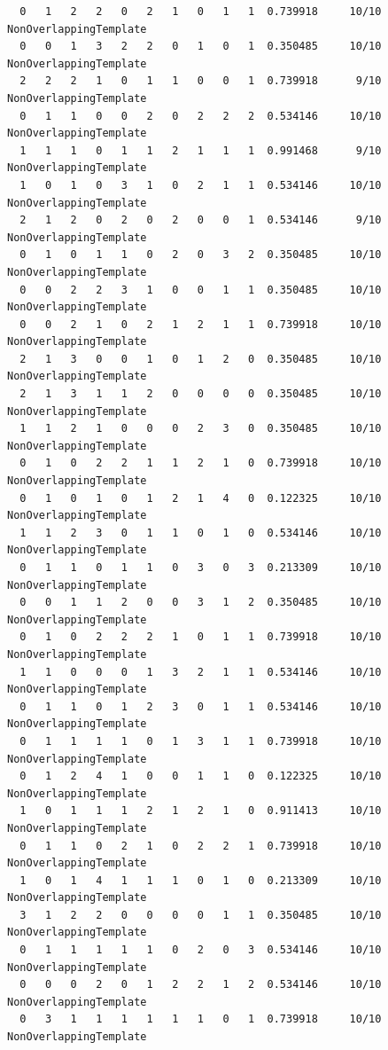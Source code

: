 \documentclass[12pt, titlepage]{report}
\theoremstyle{definition}
\begin{document}
\begin{verbatim}
  0   1   2   2   0   2   1   0   1   1  0.739918     10/10      NonOverlappingTemplate
  0   0   1   3   2   2   0   1   0   1  0.350485     10/10      NonOverlappingTemplate
  2   2   2   1   0   1   1   0   0   1  0.739918      9/10      NonOverlappingTemplate
  0   1   1   0   0   2   0   2   2   2  0.534146     10/10      NonOverlappingTemplate
  1   1   1   0   1   1   2   1   1   1  0.991468      9/10      NonOverlappingTemplate
  1   0   1   0   3   1   0   2   1   1  0.534146     10/10      NonOverlappingTemplate
  2   1   2   0   2   0   2   0   0   1  0.534146      9/10      NonOverlappingTemplate
  0   1   0   1   1   0   2   0   3   2  0.350485     10/10      NonOverlappingTemplate
  0   0   2   2   3   1   0   0   1   1  0.350485     10/10      NonOverlappingTemplate
  0   0   2   1   0   2   1   2   1   1  0.739918     10/10      NonOverlappingTemplate
  2   1   3   0   0   1   0   1   2   0  0.350485     10/10      NonOverlappingTemplate
  2   1   3   1   1   2   0   0   0   0  0.350485     10/10      NonOverlappingTemplate
  1   1   2   1   0   0   0   2   3   0  0.350485     10/10      NonOverlappingTemplate
  0   1   0   2   2   1   1   2   1   0  0.739918     10/10      NonOverlappingTemplate
  0   1   0   1   0   1   2   1   4   0  0.122325     10/10      NonOverlappingTemplate
  1   1   2   3   0   1   1   0   1   0  0.534146     10/10      NonOverlappingTemplate
  0   1   1   0   1   1   0   3   0   3  0.213309     10/10      NonOverlappingTemplate
  0   0   1   1   2   0   0   3   1   2  0.350485     10/10      NonOverlappingTemplate
  0   1   0   2   2   2   1   0   1   1  0.739918     10/10      NonOverlappingTemplate
  1   1   0   0   0   1   3   2   1   1  0.534146     10/10      NonOverlappingTemplate
  0   1   1   0   1   2   3   0   1   1  0.534146     10/10      NonOverlappingTemplate
  0   1   1   1   1   0   1   3   1   1  0.739918     10/10      NonOverlappingTemplate
  0   1   2   4   1   0   0   1   1   0  0.122325     10/10      NonOverlappingTemplate
  1   0   1   1   1   2   1   2   1   0  0.911413     10/10      NonOverlappingTemplate
  0   1   1   0   2   1   0   2   2   1  0.739918     10/10      NonOverlappingTemplate
  1   0   1   4   1   1   1   0   1   0  0.213309     10/10      NonOverlappingTemplate
  3   1   2   2   0   0   0   0   1   1  0.350485     10/10      NonOverlappingTemplate
  0   1   1   1   1   1   0   2   0   3  0.534146     10/10      NonOverlappingTemplate
  0   0   0   2   0   1   2   2   1   2  0.534146     10/10      NonOverlappingTemplate
  0   3   1   1   1   1   1   1   0   1  0.739918     10/10      NonOverlappingTemplate

\end{verbatim}
\end{document}
